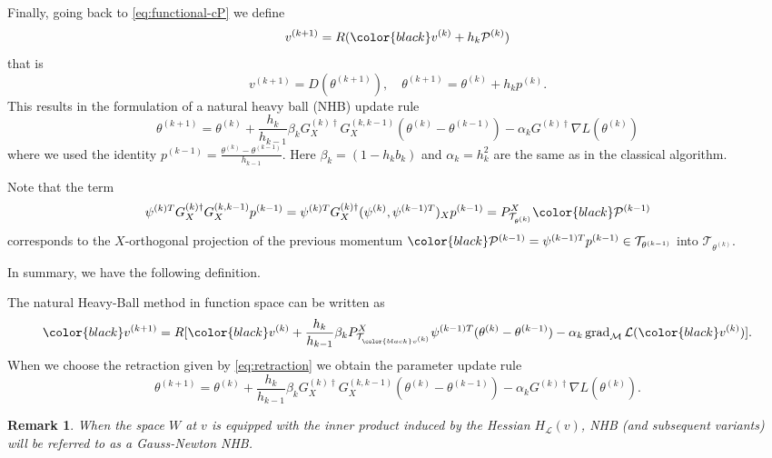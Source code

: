 \documentclass{article}
\theoremstyle{noparens}
\newtheorem{remark}{Remark}[section]
\newcommand{\cL}{\mathcal{L}}
\newcommand{\cT}{\mathcal{T}}
\newcommand{\cM}{\mathcal{M}}
\newcommand{\cP}{\mathcal{P}}
\newcommand{\colorM}{\color{black}}
\newcommand{\colorT}{\color{black}}
\newcommand{\paramk}{\theta^{(k)}}
\newcommand{\paramkm}{\theta^{(k-1)}}
\newcommand{\paramkp}{\theta^{(k+1)}}
\newcommand{\vk}{{\colorM v^{(k)}}}
\newcommand{\vkp}{{\colorM v^{(k+1)}}}
\newcommand{\psik}{\psi^{(k)}}
\newcommand{\psikT}{\psi^{(k)T}}
\newcommand{\psikmT}{\psi^{(k-1)T}}
\newcommand{\pk}{p^{(k)}}
\newcommand{\pkm}{p^{(k-1)}}
\newcommand{\Pkm}{{\colorT \cP^{(k-1)}}}
\newcommand{\Ginvk}{{G^{(k)\dagger}}}
\newcommand{\GXinvk}{{G^{(k)\dagger}_X}}
\newcommand{\GXkkm}{{G^{(k,k-1)}_X}}
\newcommand{\GradP}{\nabla}
\newcommand{\LossGrad}{\GradP L}
\newcommand{\gradM}{\operatorname{grad}_{\cM}}
\begin{document}
Finally, going back to \eqref{eq:functional-cP} we define
$$
v^{(k+1)} = R(\vk + h_k \cP^{(k)})
$$
that is
$$
v^{(k+1)} = D(\theta^{(k+1)}), \quad \theta^{(k+1)} = \theta^{(k)} + h_k \pk.
$$
This results in the formulation of a natural heavy ball (NHB) update rule
\begin{equation}
\paramkp
= \paramk + \frac{h_k}{h_{k-1}}\beta_k\GXinvk\GXkkm(\paramk - \paramkm) - \alpha_k\Ginvk\LossGrad(\paramk) \label{eq:nhb-update}
\end{equation}
where we used the identity $\pkm=\frac{\paramk - \paramkm}{h_{k-1}}$. Here $\beta_k=(1-h_k b_k)$ and $\alpha_k=h_k^2$ are the same as in the classical algorithm.

Note that the term
$$\psikT\GXinvk\GXkkm\pkm = \psikT\GXinvk ({\psik, \psikmT})_X \pkm = P_{\cT_{\paramk}}^X \Pkm$$
corresponds to the $X$-orthogonal projection of the previous momentum $\Pkm=\psikmT\pkm\in \cT_{\paramkm}$ into $\cT_{\paramk}$.



In summary, we have the following definition.
\begin{definition}
The natural Heavy-Ball method in function space can be written as
\begin{align*}
    \vkp = R[\vk + \frac{h_k }{h_{k-1}}\beta_k P^X_{\cT_{\vk}} \psikmT (\paramk-\paramkm)  - \alpha_k \gradM \cL(\vk)].
\end{align*}
When we choose the retraction given by \eqref{eq:retraction} we obtain the parameter update rule
\begin{equation}
    \paramkp
= \paramk + \frac{h_k}{h_{k-1}}\beta_k\GXinvk\GXkkm(\paramk - \paramkm) - \alpha_k\Ginvk\LossGrad(\paramk).
\end{equation}
\end{definition}


\begin{remark}
When the space $W$ at $v$ is equipped with the inner product induced by the Hessian  $H_\cL(v)$, NHB (and subsequent variants) will be referred to as a Gauss-Newton NHB.
\end{remark}





\end{document}
